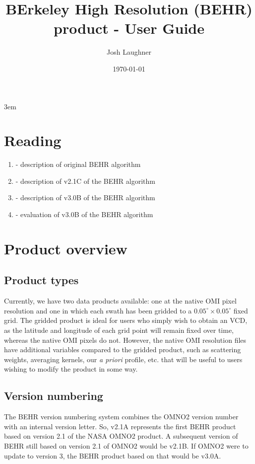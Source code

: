 \documentclass[12pt]{article}
\title{BErkeley High Resolution (BEHR) \ce{NO2} product - User Guide}
\author{Josh Laughner}
\date{\today}
\begin{document}
\maketitle

\emergencystretch 3em

\tableofcontents

\section{Reading}

	\begin{enumerate}
		\item \citet{russell11} - description of original BEHR algorithm
		\item \citet{laughner17} - description of v2.1C of the BEHR algorithm
		\item \citet{laughner18a} - description of v3.0B of the BEHR algorithm
		\item \citet{laughner18b} - evaluation of v3.0B of the BEHR algorithm
	\end{enumerate}


\section{Product overview}

	\subsection{Product types}
	Currently, we have two data products available: one at the native OMI pixel resolution and one in which each swath has been gridded to a $0.05^\circ \times 0.05^\circ$ fixed grid. The gridded product is ideal for users who simply wish to obtain an  VCD, as the latitude and longitude of each grid point will remain fixed over time, whereas the native OMI pixels do not. However, the native OMI resolution files have additional variables compared to the gridded product, such as scattering weights, averaging kernels, our  \emph{a priori} profile, etc. that will be useful to users wishing to modify the product in some way.
	
	
	\subsection{Version numbering}
	The BEHR version numbering system combines the OMNO2 version number with an
internal version letter. So, v2.1A represents the first BEHR product based on
version 2.1 of the NASA OMNO2 product. A subsequent version of BEHR still based
on version 2.1 of OMNO2 would be v2.1B. If OMNO2 were to update to version 3,
the BEHR product based on that would be v3.0A.
\end{document}
